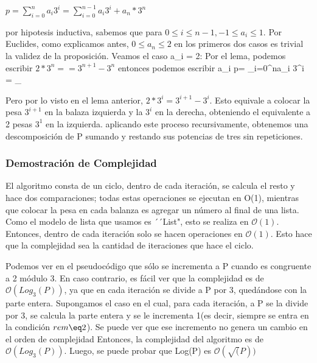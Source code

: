 \documentclass[spanish,12pt]{article}
\begin{document}

$p= \sum_{i=0}^{n}{a_i 3^{i}} =  \sum_{i=0}^{n-1}{a_i 3^{i}} + a_n*3^{n}$ 

por hipotesis inductiva, sabemos que para $0\leq i \leq n-1, -1\leq a_{i}\leq 1$. Por Euclides, como explicamos antes, $0\leq a_{n} \leq 2 $ en los primeros dos casos es trivial la validez de la proposición. 
Veamos el caso a_{i} = 2:
  Por el lema, podemos escribir $2*3^{n}= = 3^{n+1}-3^{n}$  entonces  podemos escribir a_{i} p= \sum_{i=0}^{n}{a_i 3^{i}} = \sum_{ 


 Pero por lo visto en el lema anterior, $2*3^{i}= 3^{i+1}-3^{i}$. Esto equivale a colocar la pesa $3^{i+1}$ en la balaza izquierda y la $3^{i}$ en la derecha, obteniendo el equivalente a 2 pesas $3^{1}$ en la izquierda. aplicando este proceso recursivamente, obtenemos  una descomposición de P sumando y restando sus potencias de tres sin repeticiones.


\subsubsection{Demostración de Complejidad}

El algoritmo consta de un ciclo, dentro de cada iteración, se calcula el resto y hace dos comparaciones; todas estas operaciones se ejecutan en O(1), mientras que colocar la pesa en cada balanza
es agregar un número al final de una lista. Como el modelo de lista que usamos es ´´List", esto se realiza en $\mathcal{O}(1)$.
Entonces, dentro de cada iteración solo se hacen operaciones en $\mathcal{O}(1)$. Esto hace que la complejidad sea la cantidad de iteraciones que hace el ciclo.


Podemos ver en el pseudocódigo que sólo se incrementa a P cuando es congruente a 2 módulo 3. En caso contrario, es fácil ver que la complejidad es de $\mathcal{O}(Log_{3}(P))$, ya que en cada iteración se divide a P por 3, quedándose con la parte entera.
Supongamos el caso en el cual, para cada iteración, a P se la divide por 3, se calcula la parte entera y se le incrementa 1(es decir, siempre se entra en la condición $rem \eq 2$). Se puede ver que ese incremento no genera un cambio en el orden de complejidad
Entonces, la complejidad del algoritmo es de $\mathcal{O}(Log_{3}(P))$.
Luego, se puede probar que Log(P) es $\mathcal{O}(\sqrt(P))$





}
\end{document}
